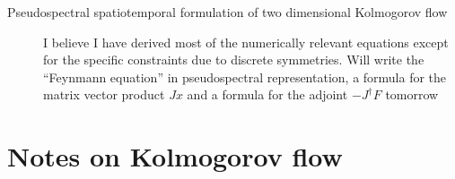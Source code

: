 \begin{description}
\item[Pseudospectral spatiotemporal formulation of two dimensional Kolmogorov flow]
I believe I have derived most of the numerically relevant equations except for the specific constraints due to
discrete symmetries. Will write the ``Feynmann equation'' in pseudospectral representation, a formula for the matrix
vector product $Jx$ and a formula for the adjoint $-J^{\dagger} F$ tomorrow

\end{description}



\section{Notes on Kolmogorov flow}
\label{sect:KFsymm} %

